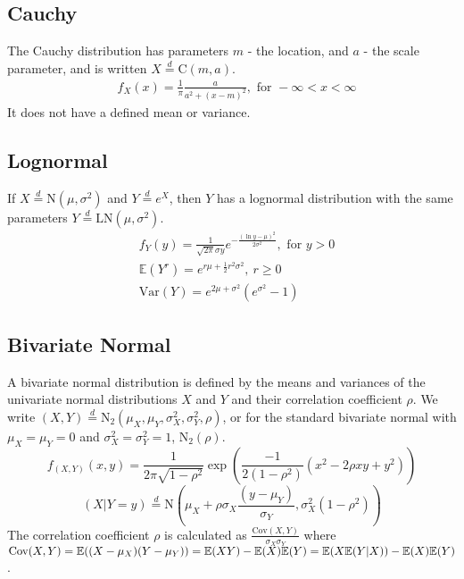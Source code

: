 \documentclass[titlepage,twocolumn]{article}
\begin{document}
\subsection*{Cauchy}
The Cauchy distribution has parameters $m$ - the location, and $a$ - the scale parameter, and is written $X\stackrel{d}{=}\mbox{C}(m, a)$.
\begin{align*}
    &f_X(x)=\frac{1}{\pi} \frac{a}{a^2 + (x-m)^2}, \mbox{ for } -\infty < x < \infty
\end{align*}
It does not have a defined mean or variance.

\subsection*{Lognormal}
If $X \stackrel{d}{=} \mbox{N}(\mu, \sigma^2)$ and $Y \stackrel{d}{=} e^X$, then $Y$ has a lognormal distribution with the same parameters $Y \stackrel{d}{=} \mbox{LN}(\mu, \sigma^2)$.
\begin{align*}
    &f_Y(y)=\frac{1}{\sqrt{2\pi}\sigma y}e^{-\frac{(\ln y - \mu)^2}{2\sigma^2}}, \mbox{ for } y > 0\\
    &\mathbb{E}(Y^r)=e^{r\mu + \frac{1}{2}r^2 \sigma^2},\ r \geq 0\\
    &\mbox{Var}(Y)=e^{2\mu + \sigma^2}(e^{\sigma^2}-1)
\end{align*}

\subsection*{Bivariate Normal}
A bivariate normal distribution is defined by the means and variances of the univariate normal distributions $X$ and $Y$ and their correlation coefficient $\rho$. We write $(X,Y) \stackrel{d}{=} \mbox{N}_{2}(\mu_X, \mu_Y, \sigma^2_X, \sigma^2_Y, \rho)$, or for the standard bivariate normal with $\mu_X = \mu_Y = 0$ and $\sigma^2_X = \sigma^2_Y = 1$, $\mbox{N}_{2}(\rho)$.
$$
f_{(X,Y)}(x,y)=\frac{1}{2 \pi \sqrt{1 - \rho^2}}\exp{\left(\frac{-1}{2(1-\rho^2)}(x^2 - 2 \rho x y + y^2)\right)}$$ $$
(X|Y=y) \stackrel{d}{=} \mbox{N}(\mu_X + \rho \sigma_X \frac{(y-\mu_Y)}{\sigma_Y}, \sigma_X^2(1-\rho^2))
$$
The correlation coefficient $\rho$ is calculated as $\frac{\mbox{Cov}(X,Y)}{\sigma_X \sigma_Y}$ where $\mbox{Cov}(X,Y) = \mathbb{E}((X-\mu_X)(Y-\mu_Y)) = \mathbb{E}(XY) - \mathbb{E}(X)\mathbb{E}(Y) \\ = \mathbb{E}(X \mathbb{E}(Y|X)) - \mathbb{E}(X)\mathbb{E}(Y)$.
\end{document}
